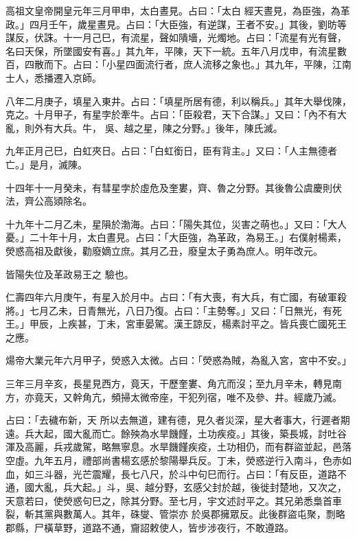 \begin{pinyinscope}
 高祖文皇帝開皇元年三月甲申，太白晝見。占曰：「太白
 經天晝見，為臣強，為革政。」四月壬午，歲星晝見。占曰：「大臣強，有逆謀，王者不安。」其後，劉昉等謀反，伏誅。十一月己巳，有流星，聲如隤墻，光燭地。占曰：「流星有光有聲，名曰天保，所墜國安有喜。」其九年，平陳，天下一統。五年八月戊申，有流星數百，四散而下。占曰：「小星四面流行者，庶人流移之象也。」其九年，平陳，江南士人，悉播遷入京師。



 八年二月庚子，填星入東井。占曰：「填星所居有德，利以稱兵。」其年大舉伐陳，克之。十月甲子，有星孛於牽牛。占曰：「臣殺君，天下合謀。」又曰：「內不有大亂，則外有大兵。牛，
 吳、越之星，陳之分野。」後年，陳氏滅。



 九年正月己巳，白虹夾日。占曰：「白虹銜日，臣有背主。」又曰：「人主無德者亡。」是月，滅陳。



 十四年十一月癸未，有彗星孛於虛危及奎婁，齊、魯之分野。其後魯公虞慶則伏法，齊公高熲除名。



 十九年十二月乙未，星隕於渤海。占曰：「陽失其位，災害之萌也。」又曰：「大人憂。」二十年十月，太白晝見。占曰：「大臣強，為革政，為易王。」右僕射楊素，熒惑高祖及獻後，勸廢嫡立庶。其月乙丑，廢皇太子勇為庶人。明年改元。



 皆陽失位及革政易王之
 驗也。



 仁壽四年六月庚午，有星入於月中。占曰：「有大喪，有大兵，有亡國，有破軍殺將。」七月乙未，日青無光，八日乃復。占曰：「主勢奪。」又曰：「日無光，有死王。」甲辰，上疾甚，丁未，宮車晏駕。漢王諒反，楊素討平之。皆兵喪亡國死王之應。



 煬帝大業元年六月甲子，熒惑入太微。占曰：「熒惑為賊，為亂入宮，宮中不安。」



 三年三月辛亥，長星見西方，竟天，干歷奎婁、角亢而沒；至九月辛未，轉見南方，亦竟天，又幹角亢，頻掃太微帝座，干犯列宿，唯不及參、井。經歲乃滅。



 占曰：「去穢布新，天
 所以去無道，建有德，見久者災深，星大者事大，行遲者期遠。兵大起，國大亂而亡。餘殃為水旱饑饉，土功疾疫。」其後，築長城，討吐谷渾及高麗，兵戎歲駕，略無寧息。水旱饑饉疾疫，土功相仍，而有群盜並起，邑落空虛。九年五月，禮部尚書楊玄感於黎陽舉兵反。丁未，熒惑逆行入南斗，色赤如血，如三斗器，光芒震耀，長七八尺，於斗中句巳而行。占曰：「有反臣，道路不通，國大亂，兵大起。」斗，吳、越分野，玄感父封於越，後徙封楚地，又次之，天意若曰，使熒惑句巳之，除其分野。至七月，宇文述討平之。其兄弟悉梟首車裂，斬其黨與數萬人。其年，硃燮、管崇亦
 於吳郡擁眾反。此後群盜屯聚，剽略郡縣，尸橫草野，道路不通，齎詔敕使人，皆步涉夜行，不敢遵路。




\end{pinyinscope}

